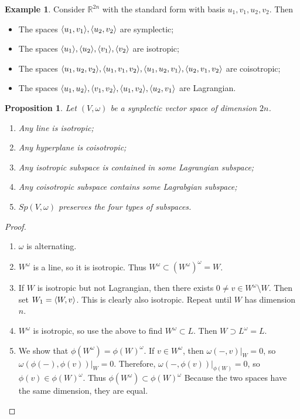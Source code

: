 \documentclass[leqno, openany]{memoir}
\DeclarePairedDelimiter{\gen}{\langle}{\rangle}
\newtheorem{prop}[thm]{Proposition}
\theoremstyle{definition}
\newtheorem{exm}[thm]{Example}
\theoremstyle{remark}
\theoremstyle{plain}
\theoremstyle{definition}
\theoremstyle{remark}
\newcommand{\R}{\mathbb{R}}
\begin{document}
\begin{exm}
    Consider $\R^{2n}$ with the standard form with basis $u_1, v_1, u_2, v_2$. Then
    \begin{itemize}
        \item The spaces $\gen{u_1, v_1}, \gen{u_2, v_2}$ are symplectic;
        \item The spaces $\gen{u_1}, \gen{u_2}, \gen{v_1}, \gen{v_2}$ are isotropic;
        \item The spaces $\gen{u_1, u_2, v_2}, \gen{u_1, v_1, v_2}, \gen{u_1, u_2, v_1}, \gen{u_2, v_1, v_2}$ are coisotropic;
        \item The spaces $\gen{u_1, u_2}, \gen{v_1, v_2}, \gen{u_1, v_2}, \gen{u_2, v_1}$ are Lagrangian.
    \end{itemize}
\end{exm}

\begin{prop}
    Let $(V, \omega)$ be a synplectic vector space of dimension $2n$.
    \begin{enumerate}
        \item Any line is isotropic;
        \item Any hyperplane is coisotropic;
        \item Any isotropic subspace is contained in some Lagrangian subspace;
        \item Any coisotropic subspace contains some Lagrabgian subspace;
        \item $Sp(V, \omega)$ preserves the four types of subspaces.
    \end{enumerate}
\end{prop}

\begin{proof}
    \begin{enumerate}
        \item $\omega$ is alternating.
        \item $W^{\omega}$ is a line, so it is isotropic. Thus $W^{\omega} \subset ( W^{\omega} )^{\omega} = W$.
        \item If $W$ is isotropic but not Lagrangian, then there exists $0 \neq v \in W^{\omega} \setminus W$. Then set $W_1 = \gen{W, v}$. This is clearly also isotropic. Repeat until $W$ has dimension $n$.
        \item $W^{\omega}$ is isotropic, so use the above to find $W^{\omega} \subset L$. Then $W \supset L^{\omega} = L$.
        \item We show that $\phi(W^{\omega}) = \phi(W)^{\omega}$. If $v \in W^{\omega}$, then $\omega(-, v)|_{W} = 0$, so $\omega(\phi(-), \phi(v))|_W = 0$. Therefore, $\omega(-, \phi(v))|_{\phi(W)} = 0$, so $\phi(v) \in \phi(W)^{\omega}$. Thus $\phi(W^{\omega}) \subset \phi(W)^{\omega}$ Because the two spaces have the same dimension, they are equal. \qedhere
    \end{enumerate}
\end{proof}
\end{document}

